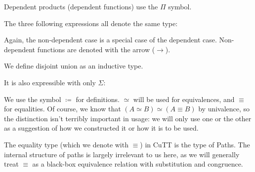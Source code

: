 \begin{definition}
  Dependent products (dependent functions) use the \(\Pi\) symbol.

  The three following expressions all denote the same type:

  \begin{multicols}{3}
    \begin{agdalisting}
    \end{agdalisting}

    \begin{agdalisting}
    \end{agdalisting}

    \begin{agdalisting}
    \end{agdalisting}
  \end{multicols}

  Again, the non-dependent case is a special case of the dependent case.
  Non-dependent functions are denoted with the arrow (\(\rightarrow\)).
\end{definition}

\begin{definition}
  We define disjoint union as an inductive type.
  \begin{agdalisting}
  \end{agdalisting}
  It is also expressible with only \(\Sigma\):
  \begin{agdalisting}
  \end{agdalisting}
\end{definition}
\begin{definition} We use the symbol \(\coloneqq\)
  for definitions.
  \(\simeq\) will be used for equivalences, and \(\equiv\) for equalities.
  Of course, we know that \((A \simeq B) \simeq (A \equiv B)\) by univalence,
  so the distinction isn't terribly important in usage: we will only use one
  or the other as a suggestion of how we constructed it or how it is to be
  used.
\end{definition}

\begin{definition} \label{path-types}
  The equality type (which we denote with \(\equiv\)) in CuTT is the type of
  Paths\footnotemark.
  The internal structure of paths is largely irrelevant to us here, as we will
  generally treat \(\equiv\) as a black-box equivalence relation with
  substitution and congruence.
\end{definition}

